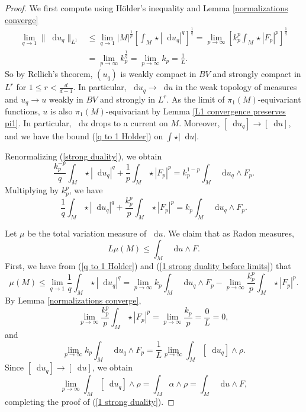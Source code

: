 \documentclass[reqno,11pt]{amsart}
\newcommand*\dif{\mathop{}\!\mathrm{d}}
\theoremstyle{definition}
\numberwithin{equation}{section}
\begin{document}
\begin{proof}
We first compute using H\"older's inequality and Lemma \ref{normalizations converge}
\begin{align*}
\lim_{q \to 1} \|\dif u_q\|_{L^1}
&\leq \lim_{q \to 1} |M|^{\frac{1}{p}} \left[\int_M \star |\dif u_q|^q\right]^{\frac{1}{q}} = \lim_{p \to \infty} \left[k_p^p \int_M \star |F_p|^p\right]^{\frac{1}{q}} \\
&= \lim_{p \to \infty} k_p^{\frac{1}{q}} = \lim_{p \to \infty} k_p = \frac{1}{L}.
\end{align*}
So by Rellich's theorem, $(u_q)$ is weakly compact in $BV$ and strongly compact in $L^r$ for $1 \leq r < \frac{d}{d - 1}$.
In particular, $\dif u_q \to \dif u$ in the weak topology of measures and $u_q \to u$ weakly in $BV$ and strongly in $L^r$.
As the limit of $\pi_1(M)$-equivariant functions, $u$ is also $\pi_1(M)$-equivariant by Lemma \ref{L1 convergence preserves pi1}.
In particular, $\dif u$ drops to a current on $M$.
Moreover, $[\dif u_q] \to [\dif u]$, and we have the bound (\ref{q to 1 Holder}) on $\int \star |\dif u|$.

Renormalizing (\ref{strong duality}), we obtain 
$$\frac{k_p^{-p}}{q} \int_M \star |\dif u_q|^q + \frac{1}{p} \int_M \star |F_p|^p = k_p^{1 - p} \int_M \dif u_q \wedge F_p.$$
Multiplying by $k_p^p$, we have 
\begin{equation}\label{1 strong duality before limits}
	\frac{1}{q} \int_M \star |\dif u_q|^q + \frac{k_p^p}{p} \int_M \star |F_p|^p = k_p \int_M \dif u_q \wedge F_p.
\end{equation}

Let $\mu$ be the total variation measure of $\dif u$.
We claim that as Radon measures,
\begin{equation}\label{1 strong duality}
	L\mu(M) \leq \int_M \dif u \wedge F.
\end{equation}
First, we have from (\ref{q to 1 Holder}) and (\ref{1 strong duality before limits}) that
$$\mu(M) \leq \lim_{q \to 1} \frac{1}{q} \int_M \star |\dif u_q|^q = \lim_{p \to \infty} k_p \int_M \dif u_q \wedge F_p - \lim_{p \to \infty} \frac{k_p^p}{p} \int_M \star |F_p|^p.$$
By Lemma \ref{normalizations converge},
$$\lim_{p \to \infty} \frac{k_p^p}{p} \int_M \star |F_p|^p = \lim_{p \to \infty} \frac{k_p}{p} = \frac{0}{L} = 0,$$
and
$$\lim_{p \to \infty} k_p \int_M \dif u_q \wedge F_p = \frac{1}{L} \lim_{p \to \infty} \int_M [\dif u_q] \wedge \rho.$$
Since $[\dif u_q] \to [\dif u]$, we obtain
$$\lim_{p \to \infty} \int_M [\dif u_q] \wedge \rho = \int_M \alpha \wedge \rho = \int_M \dif u \wedge F,$$
completing the proof of (\ref{1 strong duality}).


\end{proof}
\end{document}
